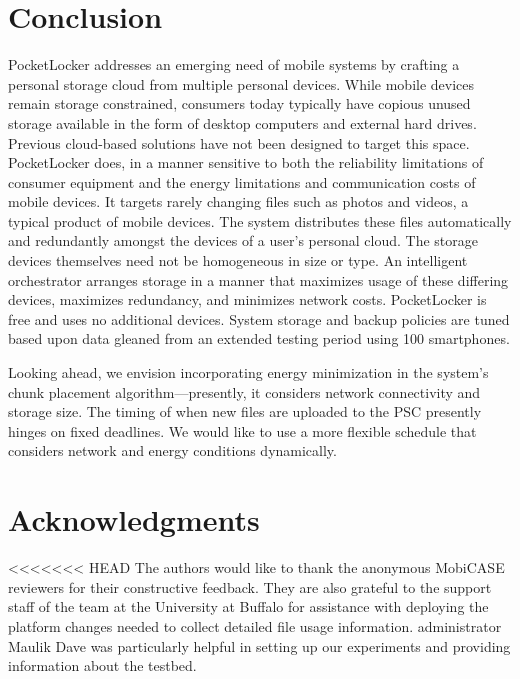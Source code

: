 
\section{Conclusion}
\label{sec-conclusion}

PocketLocker addresses an emerging need of mobile systems by crafting a
personal storage cloud from multiple personal devices.  While mobile devices
remain storage constrained, consumers today typically have copious unused
storage available in the form of desktop computers and external hard drives.
Previous cloud-based solutions have not been designed to target this space.
PocketLocker does, in a manner sensitive to both the reliability limitations of
consumer equipment and the energy limitations and communication costs of mobile
devices. It targets rarely changing files such as photos and videos, a typical
product of mobile devices.  The system distributes these files automatically
and redundantly amongst the devices of a user's personal cloud. The storage
devices themselves need not be homogeneous in size or type.  An intelligent
orchestrator arranges storage in a manner that maximizes usage of these
differing devices, maximizes redundancy, and minimizes network costs.
PocketLocker is free and uses no additional devices.  System storage and backup
policies are tuned based upon data gleaned from an extended testing period
using 100 smartphones.

Looking ahead, we envision incorporating energy minimization in the system's
chunk placement algorithm---presently, it considers network connectivity and
storage size.  The timing of when new files are uploaded to the PSC presently
hinges on fixed deadlines.  We would like to use a more flexible schedule that
considers network and energy conditions dynamically.

\section*{Acknowledgments}

<<<<<<< HEAD
The authors would like to thank the anonymous MobiCASE reviewers for their
constructive feedback. They are also grateful to the support staff of the
\PhoneLab{} team at the University at Buffalo for assistance with deploying the
platform changes needed to collect detailed file usage information. \PhoneLab{}
administrator Maulik Dave was particularly helpful in setting up our
experiments and providing information about the testbed.


